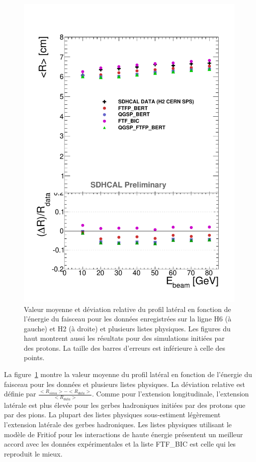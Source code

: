\begin{figure}[!ht]
  \includegraphics[width=.48\textwidth]{Shower/figs/RADPROF_PION_MODEL_NOV.pdf}
  \caption{Valeur moyenne et déviation relative du profil latéral en fonction de l'énergie du faisceau pour les données enregistrées sur la ligne H6 (à gauche) et H2 (à droite) et plusieurs listes physiques. Les figures du haut montrent aussi les résultats pour des simulations initiées par des protons. La taille des barres d'erreurs est inférieure à celle des points.}
  \label{fig.radial_pi-_ebeam}
\end{figure}
La figure~\ref{fig.radial_pi-_ebeam} montre la valeur moyenne du profil latéral en fonction de l'énergie du faisceau pour les données et plusieurs listes physiques. La déviation relative est définie par $\frac{<R_{simu}>-<R_{data}>}{<R_{data}>}$. Comme pour l'extension longitudinale, l'extension latérale est plus élevée pour les gerbes hadroniques initiées par des protons que par des pions. La plupart des listes physiques sous-estiment légèrement l'extension latérale des gerbes hadroniques. Les listes physiques utilisant le modèle de Fritiof pour les interactions de haute énergie présentent un meilleur accord avec les données expérimentales et la liste FTF\_BIC est celle qui les reproduit le mieux.

